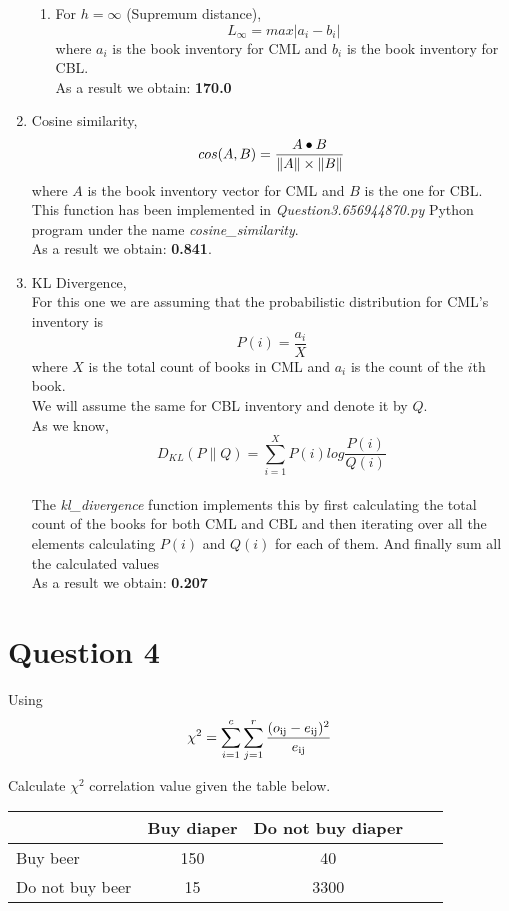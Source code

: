 \documentclass[11pt]{article}
\begin{document}
\begin{enumerate}[label=(\alph*)]
\begin{enumerate}[label=\roman*.]
\item For $h = \infty$ (Supremum distance),
\[ L_\infty = max | a_i - b_i | \]
where $a_i$ is the book inventory for CML and $b_i$ is the book inventory for CBL.\\
As a result we obtain: \textbf{170.0}
\end{enumerate}

\item Cosine similarity,
\[ cos(A, B) = \frac{A\bullet B}{\left\lVert A\right\rVert \times \left\lVert B\right\rVert} \]
where $A$ is the book inventory vector for CML and $B$ is the one for CBL.\\
This function has been implemented in \textit{Question3.656944870.py} Python program under the name \textit{cosine\_similarity}.\\
As a result we obtain: \textbf{0.841}.\\

\item KL Divergence,\\
For this one we are assuming that the probabilistic distribution for CML's inventory is 
\[ P(i) = \frac{a_i}{X} \]
where $X$ is the total count of books in CML and $a_i$ is the count of the $i$th book.\\

We will assume the same for CBL inventory and denote it by $Q$.\\

As we know, 
\[ D_{KL}(P\lVert Q) = \sum ^X_{i=1} P(i)log\frac{P(i)}{Q(i)} \]\\
The \textit{kl\_divergence} function implements this by first calculating the total count of the books for both CML and CBL and then iterating over all the elements calculating $P(i)$ and $Q(i)$ for each of them. And finally sum all the calculated values\\
As a result we obtain: \textbf{0.207}

\end{enumerate}

\newpage \nocite{*}

\section*{Question 4}
Using 
\[ \chi^2 = \sum ^c_{i=1}\sum ^r_{j=1}\frac{(o\textsubscript{ij} - e\textsubscript{ij})^2}{e\textsubscript{ij}} \]

Calculate $\chi^2$ correlation value given the table below.\\

\begin{center}
\begin{tabular}{l*{3}{c}r}
                                     & Buy diaper & Do not buy diaper \\
\hline
Buy beer                      & 150 &    40  \\
Do not buy beer          &   15 & 3300 \\
\bottomrule
\end{tabular}
\end{center}
\end{document}
